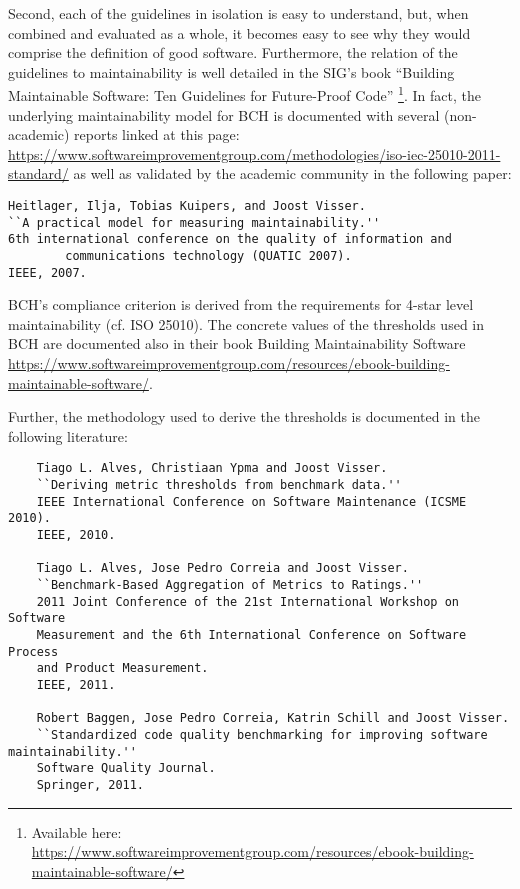 \documentclass[11pt,fleqn]{article}
\begin{document}
Second, each of the guidelines in isolation is easy to understand, but, when 
combined and evaluated as a whole, it becomes easy to see why 
they would comprise the definition of good software. Furthermore, the relation of the 
guidelines to maintainability is well detailed in the SIG's book ``Building Maintainable 
Software: Ten Guidelines for Future-Proof Code''
\footnote{Available here: \url{https://www.softwareimprovementgroup.com/resources/ebook-building-maintainable-software/}}.
In fact, the underlying maintainability model for BCH is documented with several
(non-academic) reports linked at this page:
\url{https://www.softwareimprovementgroup.com/methodologies/iso-iec-25010-2011-standard/} as 
well as validated by the academic community in the following paper:

\begin{verbatim}
Heitlager, Ilja, Tobias Kuipers, and Joost Visser. 
``A practical model for measuring maintainability.'' 
6th international conference on the quality of information and 
        communications technology (QUATIC 2007). 
IEEE, 2007.
\end{verbatim}

BCH's compliance criterion is derived from the requirements for 4-star level maintainability (cf. ISO 25010). 
The concrete values of the thresholds used in BCH are documented also in their book Building Maintainability 
Software \url{https://www.softwareimprovementgroup.com/resources/ebook-building-maintainable-software/}.

Further, the methodology used to derive the thresholds is documented in the following 
literature:

\begin{verbatim}
    Tiago L. Alves, Christiaan Ypma and Joost Visser. 
    ``Deriving metric thresholds from benchmark data.'' 
    IEEE International Conference on Software Maintenance (ICSME 2010). 
    IEEE, 2010.

    Tiago L. Alves, Jose Pedro Correia and Joost Visser. 
    ``Benchmark-Based Aggregation of Metrics to Ratings.'' 
    2011 Joint Conference of the 21st International Workshop on Software 
    Measurement and the 6th International Conference on Software Process 
    and Product Measurement. 
    IEEE, 2011.

    Robert Baggen, Jose Pedro Correia, Katrin Schill and Joost Visser. 
    ``Standardized code quality benchmarking for improving software maintainability.'' 
    Software Quality Journal.
    Springer, 2011.

\end{verbatim}
\end{document}
